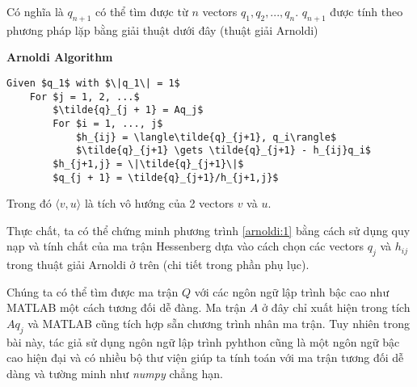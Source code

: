 Có nghĩa là $q_{n+1}$ có thể tìm được từ $n$ vectors $q_1, q_2, ..., q_n$. 
$q_{n+1}$ được tính theo phương pháp lặp bằng giải thuật dưới đây (thuật giải Arnoldi)


\textbf{Arnoldi Algorithm}
\begin{lstlisting}[style=algo]
    Given $q_1$ with $\|q_1\| = 1$
    For $j = 1, 2, ...$
        $\tilde{q}_{j + 1} = Aq_j$
        For $i = 1, ..., j$
            $h_{ij} = \langle\tilde{q}_{j+1}, q_i\rangle$
            $\tilde{q}_{j+1} \gets \tilde{q}_{j+1} - h_{ij}q_i$
        $h_{j+1,j} = \|\tilde{q}_{j+1}\|$
        $q_{j + 1} = \tilde{q}_{j+1}/h_{j+1,j}$
\end{lstlisting}

Trong đó $\langle v, u \rangle$ là tích vô hướng của 2 vectors $v$ và $u$.

Thực chất, ta có thể chứng minh phương trình \eqref{arnoldi:1} bằng cách sử dụng quy nạp và tính chất
của ma trận Hessenberg dựa vào cách chọn các vectors $q_j$ và $h_{ij}$ trong thuật giải Arnoldi ở trên 
(chi tiết trong phần phụ lục).


Chúng ta có thể tìm được ma trận $Q$ với các ngôn ngữ lập trình bậc cao như MATLAB một cách 
tương đối dễ đàng. Ma trận $A$ ở đây chỉ xuất hiện trong tích $Aq_j$ và MATLAB cũng tích hợp 
sẵn chương trình nhân ma trận. Tuy nhiên trong bài này, tác giả sử dụng ngôn ngữ lập trình pyhthon 
cũng là một ngôn ngữ bậc cao hiện đại và có nhiều bộ thư viện giúp ta tính toán với ma trận tương 
đối dễ dàng và tường minh như \textit{numpy} chẳng hạn.
